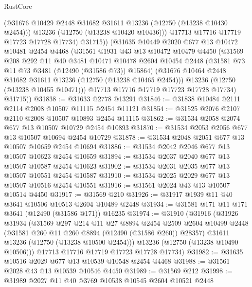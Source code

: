 \begin{lexlean}{RustCore}
\begin{coremodule}
              (@31676 @10429 @2448 @31682 @31611 @13236 (@12750 (@13238 @10430 @2454)))
              @13236
              (@12750 (@13238 @10420 @10436)))
            @17713
            @17716
            @17719
            @17723
            @17728
            @17734)
          @31715))
      (@31635
        @10449
        @2020
        @677
        @13
        @10472
        @10481
        @2454
        @4468
        (@31561
          @1931
          @43
          @13
          @10472
          @10479
          @4450
          (@31569
            @208
            @292
            @11
            @40
            @3481
            @10471
            @10478
            @2604
            @10454
            @2448
            (@31581 @73 @11 @73 @3481 (@12490 (@31586 @73)) @15864)
            (@31676 @10464 @2448 @31682 @31611 @13236 (@12750 (@13238 @10465 @2454)))
            @13236
            (@12750 (@13238 @10455 @10471)))
          @17713
          @17716
          @17719
          @17723
          @17728
          @17734)
        @31715))
@31838 := @31633 @2778 @13291
@31846 := @31838 @10484 @2111 @2114 @2008 @10507 @11115 @2454 @11121
@31854 := @31525 @2076 @2107 @2110 @2008 @10507 @10893 @2454 @11115
@31862 := @31534 @2058 @2074 @677 @13 @10507 @10729 @2454 @10893
@31870 := @31534 @2053 @2056 @677 @13 @10507 @10694 @2454 @10729
@31878 := @31534 @2048 @2051 @677 @13 @10507 @10659 @2454 @10694
@31886 := @31534 @2042 @2046 @677 @13 @10507 @10623 @2454 @10659
@31894 := @31534 @2037 @2040 @677 @13 @10507 @10587 @2454 @10623
@31902 := @31534 @2031 @2035 @677 @13 @10507 @10551 @2454 @10587
@31910 := @31534 @2025 @2029 @677 @13 @10507 @10516 @2454 @10551
@31916 := @31561 @2024 @43 @13 @10507 @10514 @4450
@31917 := @31569 @210
@31926 := @31917 @1939 @11 @40 @3641 @10506 @10513 @2604 @10489 @2448
@31934 := @31581 @171 @11 @171 @3641 (@12490 (@31586 @171)) @16235
@31974 := @31910
    (@31916
      (@31926
        @31934
        (@31569
          @297
          @214
          @11
          @27
          @8894
          @2454
          @2509
          @2604
          @10499
          @2448
          (@31581 @260 @11 @260 @8894 (@12490 (@31586 @260)) @28357)
          @31611
          @13236
          (@12750 (@13238 @10500 @2454)))
        @13236
        (@12750 (@13238 @10490 @10506)))
      @17713
      @17716
      @17719
      @17723
      @17728
      @17734)
@31982 := @31635 @10516 @2029 @677 @13 @10539 @10548 @2454 @4468
@31988 := @31561 @2028 @43 @13 @10539 @10546 @4450
@31989 := @31569 @212
@31998 := @31989 @2027 @11 @40 @3769 @10538 @10545 @2604 @10521 @2448

\end{coremodule}
\end{lexlean}
